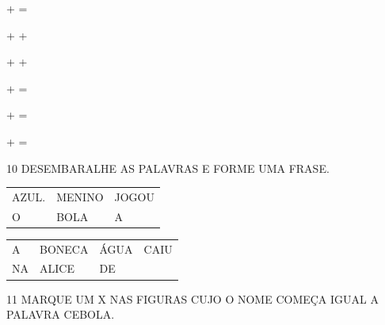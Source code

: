 \begin{escola}
\begin{escolha}
\item + = 

\item + + 

\item + + 

\item + = 

\item + = 

\item + = 
\end{escolha}

\num{10} DESEMBARALHE AS PALAVRAS E FORME UMA FRASE.

\begin{longtable}[]{@{}lll@{}}
\toprule
AZUL. & MENINO & JOGOU\tabularnewline
O & BOLA & A\tabularnewline
\bottomrule
\end{longtable}


\begin{longtable}[]{@{}llll@{}}
\toprule
A & BONECA & ÁGUA & CAIU\tabularnewline
NA & ALICE & DE\tabularnewline
\bottomrule
\end{longtable}


\num{11} MARQUE UM X NAS FIGURAS CUJO O NOME COMEÇA IGUAL A PALAVRA CEBOLA.





\end{escola}
